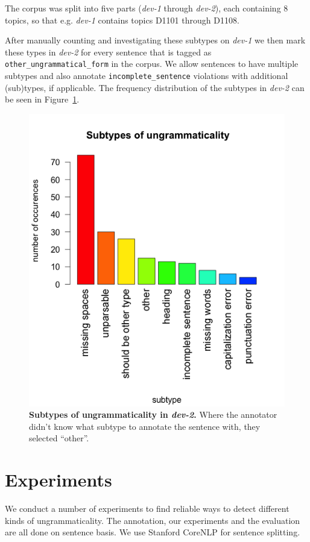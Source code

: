 \documentclass[a4paper,10pt]{scrartcl}
\theoremstyle{style}
\begin{document}
The corpus was split into five parts (\textit{dev-1} through \textit{dev-2}), each containing 8 topics, so that e.g. \textit{dev-1} contains topics D1101 through D1108.

After manually counting and investigating these subtypes on \textit{dev-1} we then mark these types in \textit{dev-2} for every sentence that is tagged as \texttt{other\_ungrammatical\_form} in the corpus. We allow sentences to have multiple subtypes and also annotate \texttt{incomplete\_sentence} violations with additional (sub)types, if applicable. The frequency distribution of the subtypes in \textit{dev-2} can be seen in Figure~\ref{subtypes}.

\begin{figure}
\begin{center}
\includegraphics[scale=0.6]{subtypes_dev2.png}
\end{center}
\caption{\textbf{Subtypes of ungrammaticality in \textit{dev-2}.} Where the annotator didn't know what subtype to annotate the sentence with, they selected ``other''.}
\label{subtypes}
\end{figure}

\section{Experiments}
We conduct a number of experiments to find reliable ways to detect different kinds of ungrammaticality. The annotation, our experiments and the evaluation are all done on sentence basis. We use Stanford CoreNLP for sentence splitting.
\end{document}
